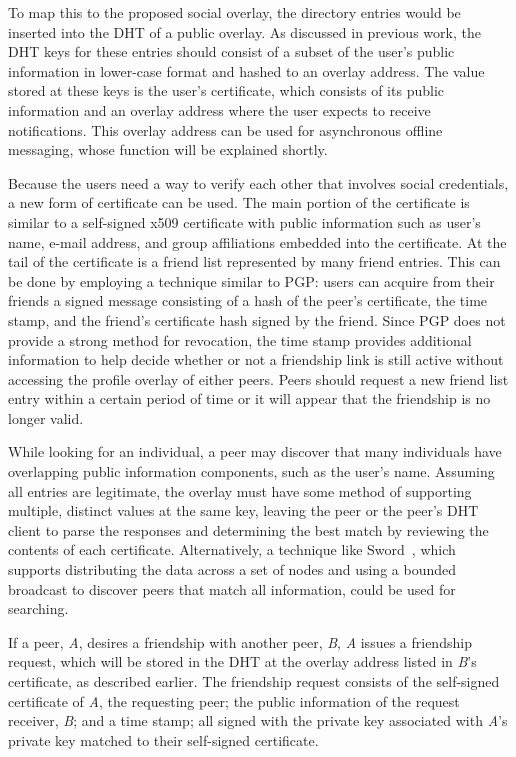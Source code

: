 To map this to the proposed social overlay, the directory entries would be
inserted into the DHT of a public overlay.  As discussed in previous work, the
DHT keys for these entries should consist of a subset of the user's public
information in lower-case format and hashed to an overlay  address.  The value
stored at these keys is the user's certificate, which consists of its public
information and an overlay address where the user expects to receive
notifications.  This overlay address can be used for asynchronous offline
messaging, whose function will be explained shortly.

Because the users need a way to verify each other that involves social
credentials, a new form of certificate can be used.
The main portion of the certificate is similar to a self-signed
x509 certificate with public information such as user's name, e-mail
address, and group affiliations embedded into the certificate.  At the tail of
the certificate is a friend list represented by many friend entries.  This can
be done by employing a technique similar to PGP: users can acquire from their
friends a signed message consisting of a hash of the peer's certificate, the
time stamp, and the friend's certificate hash signed by the friend.  Since PGP
does not provide a strong method for revocation, the time stamp provides
additional information to help decide whether or not a friendship link is still
active without accessing the profile overlay of either peers.  Peers should
request a new friend list entry within a certain period of time or it will
appear that the friendship is no longer valid.

While looking for an individual, a peer may discover that many individuals have
overlapping public information components, such as the user's name.  Assuming
all entries are legitimate, the overlay must have some method of supporting
multiple, distinct values at the same key, leaving the peer or the peer's DHT
client to parse the responses and determining the best match by reviewing the
contents of each certificate.  Alternatively, a technique like
Sword~\cite{sword}, which supports distributing the data across a set of nodes
and using a bounded broadcast to discover peers that match all information,
could be used for searching.

If a peer, \textit{A}, desires a friendship with another peer, \textit{B},
\textit{A} issues a friendship request, which will be stored in the DHT
at the overlay address listed in \textit{B}'s certificate, as described earlier.
The friendship request consists of the self-signed certificate of
\textit{A}, the requesting peer; the public information of the request receiver,
\textit{B}; and a time stamp; all signed with the private key associated with 
\textit{A}'s private key matched to their self-signed certificate.

